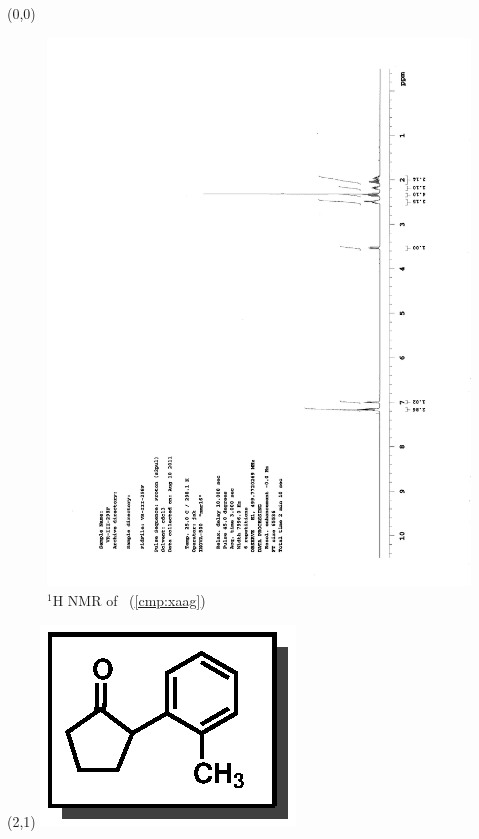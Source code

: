 \begin{textblock}{20}(0,0)
\begin{figure}[htb]
\caption{$^1$H NMR of \CMPxaag\ (\ref{cmp:xaag})}
\includegraphics[scale=0.75, trim = 0mm 0mm 0mm 5mm,
clip]{chp_asymmetric/images/nmr/xaagH}
\vspace{-100pt}
\end{figure}
\end{textblock}
\begin{textblock}{1}(2,1)
\includegraphics[scale=0.8, angle=90]{chp_asymmetric/images/xaag}
\end{textblock}
